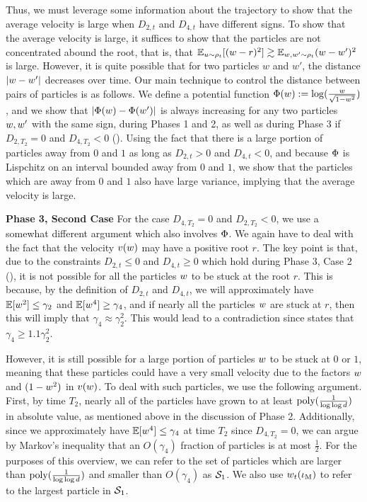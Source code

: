 Thus, we must leverage some information about the trajectory to show that the average velocity is large when $D_{2, t}$ and $D_{4, t}$ have different signs. To show that the average velocity is large, it suffices to show that the particles are not concentrated abound the root, that is, that $\operatorname*{\mathbb{E}}_{u \sim \rho_t}[(w - r)^2] \gtrsim \operatorname*{\mathbb{E}}_{w, w' \sim \rho_t}(w - w')^2$ is large. However, it is quite possible that for two particles $w$ and $w'$, the distance $|w - w'|$ decreases over time. Our main technique to control the distance between pairs of particles is as follows. We define a potential function $\Phi(w) := \log (\frac{w}{\sqrt{1 - w^2}})$, and we show that $|\Phi(w) - \Phi(w')|$ is always increasing for any two particles $w, w'$ with the same sign, during Phases 1 and 2, as well as during Phase 3 if $D_{2, T_2} = 0$ and $D_{4, T_2} < 0$ (). Using the fact that there is a large portion of particles away from $0$ and $1$ as long as $D_{2, t} > 0$ and $D_{4, t} < 0$, and because $\Phi$ is Lispchitz on an interval bounded away from $0$ and $1$, we show that the particles which are away from $0$ and $1$ also have large variance, implying that the average velocity is large.

\noindent \textbf{Phase 3, Second Case} For the case $D_{4, T_2} = 0$ and $D_{2, T_2} < 0$, we use a somewhat different argument which also involves $\Phi$. We again have to deal with the fact that the velocity $v(w)$ may have a positive root $r$. The key point is that, due to the constraints $D_{2, t} \leq 0$ and $D_{4, t} \geq 0$ which hold during Phase 3, Case 2 (), it is not possible for all the particles $w$ to be stuck at the root $r$. This is because, by the definition of $D_{2, t}$ and $D_{4, t}$, we will approximately have $\operatorname*{\mathbb{E}}[w^2] \leq \gamma_2$ and $\operatorname*{\mathbb{E}}[w^4] \geq \gamma_4$, and if nearly all the particles $w$ are stuck at $r$, then this will imply that $\gamma_4 \approx \gamma_2^2$. This would lead to a contradiction since  states that $\gamma_4 \geq 1.1 \gamma_2^2$.

However, it is still possible for a large portion of particles $w$ to be stuck at $0$ or $1$, meaning that these particles could have a very small velocity due to the factors $w$ and $(1 - w^2)$ in $v(w)$. To deal with such particles, we use the following argument. First, by time $T_2$, nearly all of the particles have grown to at least $\textup{poly}(\frac{1}{\log \log d})$ in absolute value, as mentioned above in the discussion of Phase 2. Additionally, since we approximately have $\operatorname*{\mathbb{E}}[w^4] \leq \gamma_4$ at time $T_2$ since $D_{4, T_2} = 0$, we can argue by Markov's inequality that an $O(\gamma_4)$ fraction of particles is at most $\frac{1}{2}$. For the purposes of this overview, we can refer to the set of particles which are larger than $\textup{poly}(\frac{1}{\log \log d})$ and smaller than $O(\gamma_4)$ as $\mathcal{S}_1$. We also use $w_t(\iota_{\textup{M}})$ to refer to the largest particle in $\mathcal{S}_1$.

